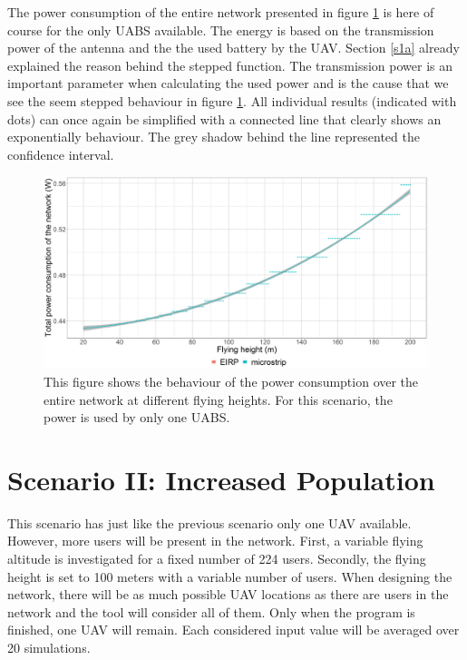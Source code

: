 The power consumption of the entire network presented in figure \ref{fig:fhvspc} is here of course for the only \gls{UABS} available.
The energy is based on the transmission power of the antenna and the the used battery by the \gls{UAV}.
Section \ref{s1a} already explained the reason behind the stepped function. The transmission power 
is an important parameter when calculating the used power and is the cause that we see the seem stepped behaviour in 
figure \ref{fig:fhvspc}. All individual results (indicated with dots) can once again be simplified 
with a connected line that clearly shows an exponentially behaviour. The grey shadow 
behind the line represented the confidence interval.

\begin{figure}[t]
  \centering
  \includegraphics[width=\textwidth]{../results/s1/fhvspc.png}
  \caption{This figure shows the behaviour of the power consumption over the entire network at different flying  heights.
  For this scenario, the power is used by only one \acs{UABS}.}
  \label{fig:fhvspc}
\end{figure}


\FloatBarrier
\section{Scenario II: Increased Population}

This scenario has just like the previous scenario only one \gls{UAV} available. However, more users will be present in the network.
First, a variable flying altitude is investigated for a fixed number of 224 users. 
Secondly, the flying height is set to 100 meters with a variable number of users.
When designing the network, there will be as much possible \gls{UAV} locations as there are users in the network and the tool
will consider all of them. Only when the program is finished, one \gls{UAV} will remain.
Each considered input value will be averaged over 20 simulations.



